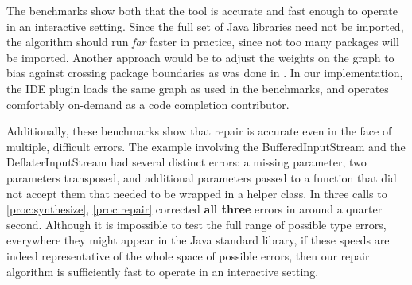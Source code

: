 The benchmarks show both that the tool is accurate and fast enough to
operate in an interactive setting. Since the full set of Java
libraries need not be imported, the algorithm should run \textit{far}
faster in practice, since not too many packages will be
imported. Another approach would be to adjust the weights on the graph
to bias against crossing package boundaries as was done in
\cite{MandelinetALL2005Jungloid}. In our implementation, the IDE
plugin loads the same graph as used in the benchmarks, and operates
comfortably on-demand as a code completion contributor.

Additionally, these benchmarks show that repair is accurate even in
the face of multiple, difficult errors. The example involving the
BufferedInputStream and the DeflaterInputStream had several distinct
errors: a missing parameter, two parameters transposed, and additional
parameters passed to a function that did not accept them that needed
to be wrapped in a helper class. In three calls to
\ref{proc:synthesize}, \ref{proc:repair} corrected \textbf{all three}
errors in around a quarter second. Although it is impossible to test
the full range of possible type errors, everywhere they might appear
in the Java standard library, if these speeds are indeed
representative of the whole space of possible errors, then our repair
algorithm is sufficiently fast to operate in an interactive setting.
